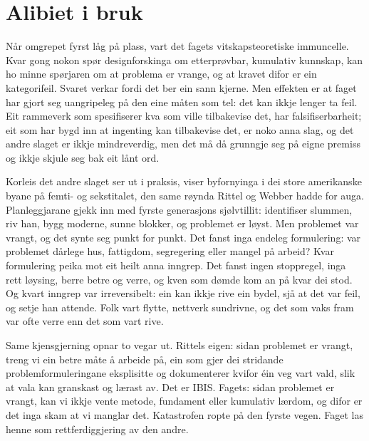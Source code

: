 \section{Alibiet i bruk}

Når omgrepet fyrst låg på plass, vart det fagets vitskapsteoretiske immuncelle. Kvar gong nokon spør designforskinga om etterprøvbar, kumulativ kunnskap, kan ho minne spørjaren om at problema er vrange, og at kravet difor er ein kategorifeil. Svaret verkar fordi det ber ein sann kjerne. Men effekten er at faget har gjort seg uangripeleg på den eine måten som tel: det kan ikkje lenger ta feil. Eit rammeverk som spesifiserer kva som ville tilbakevise det, har falsifiserbarheit; eit som har bygd inn at ingenting kan tilbakevise det, er noko anna slag, og det andre slaget er ikkje mindreverdig, men det må då grunngje seg på eigne premiss og ikkje skjule seg bak eit lånt ord.

Korleis det andre slaget ser ut i praksis, viser byfornyinga i dei store amerikanske byane på femti- og sekstitalet, den same røynda Rittel og Webber hadde for auga. Planleggjarane gjekk inn med fyrste generasjons sjølvtillit: identifiser slummen, riv han, bygg moderne, sunne blokker, og problemet er løyst. Men problemet var vrangt, og det synte seg punkt for punkt. Det fanst inga endeleg formulering: var problemet dårlege hus, fattigdom, segregering eller mangel på arbeid? Kvar formulering peika mot eit heilt anna inngrep. Det fanst ingen stoppregel, inga rett løysing, berre betre og verre, og kven som dømde kom an på kvar dei stod. Og kvart inngrep var irreversibelt: ein kan ikkje rive ein bydel, sjå at det var feil, og setje han attende. Folk vart flytte, nettverk sundrivne, og det som vaks fram var ofte verre enn det som vart rive.

Same kjensgjerning opnar to vegar ut. Rittels eigen: sidan problemet er vrangt, treng vi ein betre måte å arbeide på, ein som gjer dei stridande problemformuleringane eksplisitte og dokumenterer kvifor éin veg vart vald, slik at vala kan granskast og lærast av. Det er IBIS. Fagets: sidan problemet er vrangt, kan vi ikkje vente metode, fundament eller kumulativ lærdom, og difor er det inga skam at vi manglar det. Katastrofen ropte på den fyrste vegen. Faget las henne som rettferdiggjering av den andre.

